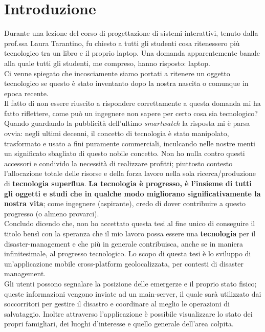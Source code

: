 \chapter*{Introduzione}
\thispagestyle{empty}

Durante una lezione del corso di progettazione di sistemi interattivi, tenuto dalla prof.ssa Laura Tarantino, fu chiesto a tutti gli studenti cosa ritenessero più tecnologico tra un libro e il proprio laptop. Una domanda apparentemente banale alla quale tutti gli studenti, me compreso, hanno risposto: laptop.\\
Ci venne spiegato che incosciamente siamo portati a ritenere un oggetto tecnologico se questo è stato inventanto dopo la nostra nascita o comunque in epoca recente.\\
Il fatto di non essere riuscito a rispondere correttamente a questa domanda mi ha fatto riflettere, come può un ingegnere non sapere per certo cosa sia tecnologico? Quando guardando la pubblicità dell'ultimo \textit{smartwatch} la risposta mi è parsa ovvia: negli ultimi decenni, il concetto di tecnologia è stato manipolato, trasformato e usato a fini puramente commerciali, inculcando nelle nostre menti un significato sbagliato di questo nobile concetto. Non ho nulla contro questi accessori e condivido la necessità di realizzare profitti; piuttosto contesto l'allocazione totale delle risorse e della forza lavoro nella sola ricerca/produzione di \textbf{tecnologia superflua}.
\textbf{La tecnologia è progresso, è l'insieme di tutti gli oggetti e studi che in qualche modo migliorano significativamente la nostra vita}; come ingegnere (aspirante), credo di dover contribuire a questo progresso (o almeno provarci).\\
Concludo dicendo che, non ho accettato questa tesi al fine unico di conseguire il titolo bensì con la speranza che il mio lavoro possa essere una \textbf{tecnologia} per il disaster-management e che più in generale contribuisca, anche se in maniera infinitesimale, al progresso tecnologico.
\newpage
Lo scopo di questa tesi è lo sviluppo di un'applicazione mobile cross-platform geolocalizzata, per contesti di disaster management.\\
Gli utenti possono segnalare la posizione delle emergerze e il proprio stato fisico; queste informazioni vengono inviate ad un main-server, il quale sarà utilizzato dai soccorritori per gestire il disastro e coordinare al meglio le operazioni di salvataggio. Inoltre attraverso l'applicazione è possibile visualizzare lo stato dei propri famigliari, dei luoghi d'interesse e quello generale dell'area colpita.\\
